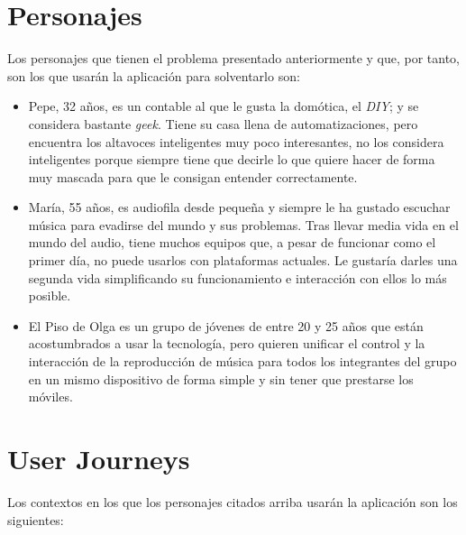 \section{Personajes}
Los personajes que tienen el problema presentado anteriormente y que, por tanto,
son los que usarán la aplicación para solventarlo son:
\begin{itemize}
    \item Pepe, 32 años, es un contable al que le gusta la domótica, el
    \emph{DIY}; y se considera bastante \emph{geek}. Tiene su casa llena de
    automatizaciones, pero encuentra los altavoces inteligentes muy poco
    interesantes, no los considera inteligentes porque siempre tiene que decirle
    lo que quiere hacer de forma muy mascada para que le consigan entender
    correctamente. 
    \item María, 55 años, es audiofila desde pequeña y siempre le ha gustado
    escuchar música para evadirse del mundo y sus problemas. Tras llevar media
    vida en el mundo del audio, tiene muchos equipos que, a pesar de funcionar
    como el primer día, no puede usarlos con plataformas actuales. Le gustaría
    darles una segunda vida simplificando su funcionamiento e interacción con
    ellos lo más posible. 
    \item El Piso de Olga es un grupo de jóvenes de entre 20 y 25 años que están
    acostumbrados a usar la tecnología, pero quieren unificar el control y la
    interacción de la reproducción de música para todos los integrantes del
    grupo en un mismo dispositivo de forma simple y sin tener que prestarse los
    móviles.
\end{itemize}

\section{User Journeys}
Los contextos en los que los personajes citados arriba usarán la aplicación son
los siguientes:\\

